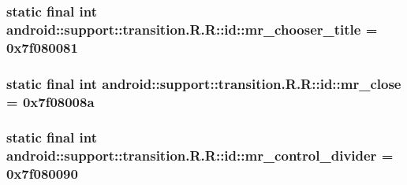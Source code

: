 \hypertarget{classandroid_1_1support_1_1transition_1_1_r_1_1id_ebd6a8bbd6a3c9a5f5bcba69a80c8cad}{
\subsubsection[{mr\_\-chooser\_\-title}]{\setlength{\rightskip}{0pt plus 5cm}static final int android::support::transition.R.R::id::mr\_\-chooser\_\-title = 0x7f080081}}
\label{classandroid_1_1support_1_1transition_1_1_r_1_1id_ebd6a8bbd6a3c9a5f5bcba69a80c8cad}


\hypertarget{classandroid_1_1support_1_1transition_1_1_r_1_1id_03e8c08509bc7530da4fe3e65adcb654}{
\subsubsection[{mr\_\-close}]{\setlength{\rightskip}{0pt plus 5cm}static final int android::support::transition.R.R::id::mr\_\-close = 0x7f08008a}}
\label{classandroid_1_1support_1_1transition_1_1_r_1_1id_03e8c08509bc7530da4fe3e65adcb654}


\hypertarget{classandroid_1_1support_1_1transition_1_1_r_1_1id_88bbee383f976d98db7609cee5595eee}{
\subsubsection[{mr\_\-control\_\-divider}]{\setlength{\rightskip}{0pt plus 5cm}static final int android::support::transition.R.R::id::mr\_\-control\_\-divider = 0x7f080090}}
\label{classandroid_1_1support_1_1transition_1_1_r_1_1id_88bbee383f976d98db7609cee5595eee}


